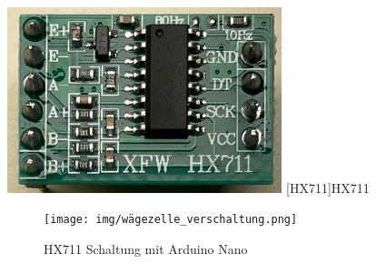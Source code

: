 \begin{center}
    \centering
    \includegraphics[width=0.6\textwidth]{img/HX711.png}
    [HX711]{HX711 \cite{prilchen}}\label{HX711}
\end{center}

\begin{figure}
   \centering
   \texttt{[image: img/wägezelle\_verschaltung.png]}
   \caption{HX711 Schaltung mit Arduino Nano \cite{prilchen}}
   \label{HX711-Nano-Schaltung}
\end{figure}


